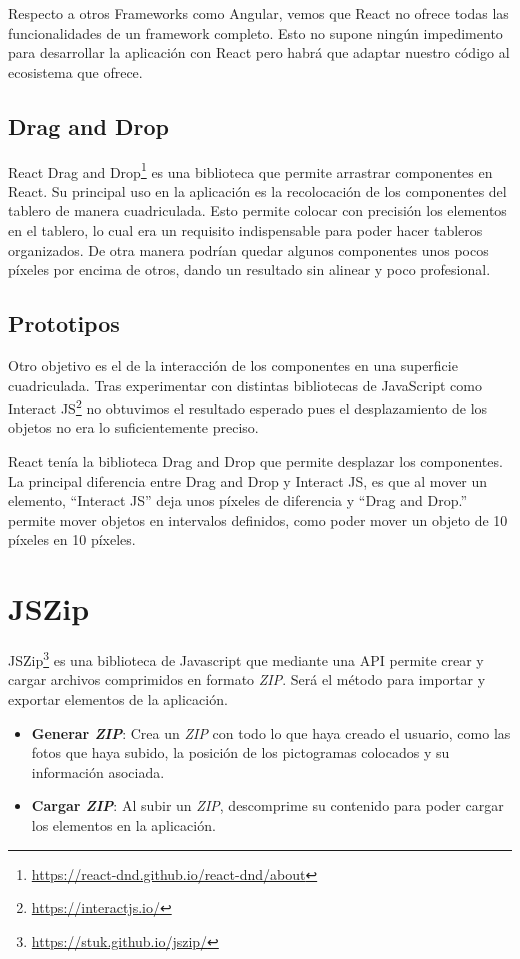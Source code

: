 Respecto a otros Frameworks como Angular, vemos que React no ofrece todas las funcionalidades de un framework completo. Esto no supone ningún impedimento para desarrollar la aplicación con React pero habrá que adaptar nuestro código al ecosistema que ofrece.



\subsection{Drag and Drop}
\label{cap3:sec:draganddrop}
React Drag and Drop\footnote{\url{https://react-dnd.github.io/react-dnd/about}} es una biblioteca que permite arrastrar componentes en React. Su principal uso en la aplicación es la recolocación de los componentes del tablero de manera cuadriculada. Esto permite colocar con precisión los elementos en el tablero, lo cual era un requisito indispensable para poder hacer tableros organizados. De otra manera podrían quedar algunos componentes unos pocos píxeles por encima de otros, dando un resultado sin alinear y poco profesional.

\subsection{Prototipos}
\label{cap3:sec:prototipos}
Otro objetivo es el de la interacción de los componentes en una superficie cuadriculada. Tras experimentar con distintas bibliotecas de JavaScript como Interact JS\footnote{\url{https://interactjs.io/}} no obtuvimos el resultado esperado pues el desplazamiento de los objetos no era lo suficientemente preciso.

React tenía la biblioteca Drag and Drop que permite desplazar los componentes. La principal diferencia entre Drag and Drop y Interact JS, es que al mover un elemento, “Interact JS” deja unos píxeles de diferencia y “Drag and Drop.” permite mover objetos en intervalos definidos, como poder mover un objeto de 10 píxeles en 10 píxeles.

\section{JSZip}
\label{cap3:sec:jszip}
JSZip\footnote{\url{https://stuk.github.io/jszip/}} es una biblioteca de Javascript que mediante una API permite crear y cargar archivos comprimidos en formato \textit{ZIP}. Será el método para importar y exportar elementos de la aplicación.
\begin{itemize}
	\item \textbf{Generar \textit{ZIP}}: Crea un \textit{ZIP} con todo lo que haya creado el usuario, como las fotos que haya subido, la posición de los pictogramas colocados y su información asociada.
	\item \textbf{Cargar \textit{ZIP}}: Al subir un \textit{ZIP}, descomprime su contenido para poder cargar los elementos en la aplicación.
\end{itemize}	


